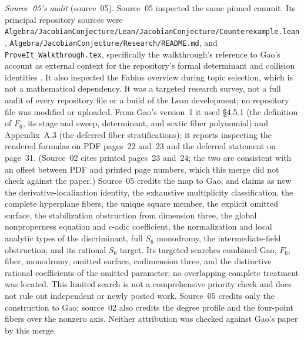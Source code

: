 \documentclass[11pt,a4paper]{article}
\theoremstyle{definition}
\newcommand{\code}[1]{\texttt{\nolinkurl{#1}}}
\newcommand{\src}[1]{\textup{(source~#1)}}
\begin{document}
\emph{Source~05's audit} \src{05}. Source~05 inspected the same pinned commit.
Its principal repository sources were
\code{Algebra/JacobianConjecture/Lean/JacobianConjecture/Counterexample.lean},
\code{Algebra/JacobianConjecture/Research/README.md}, and
\code{ProveIt_Walkthrough.tex}, specifically the walkthrough's reference to
Gao's account as external context for the repository's formal determinant
and collision identities \cite{ProveItWalkthrough}. It also inspected the
Fabius overview during topic selection, which is not a mathematical
dependency. It was a targeted research survey, not a full audit of every
repository file or a build of the Lean development; no repository file was
modified or uploaded. From Gao's version~1 it used \S4.5.1 (the definition of
$F_6$, its stage and sweep, determinant, and sextic fiber polynomial) and
Appendix~A.3 (the deferred fiber stratifications); it reports inspecting the
rendered formulas on PDF pages~22 and~23 and the deferred statement on
page~31. (Source~02 cites printed pages~23 and~24; the two are consistent
with an offset between PDF and printed page numbers, which this merge did
not check against the paper.) Source~05 credits the map to Gao, and claims
as new the derivative-localization identity, the exhaustive multiplicity
classification, the complete hyperplane fibers, the unique square member, the
explicit omitted surface, the stabilization obstruction from dimension three,
the global nonproperness equation and $c$-adic coefficient, the normalization
and local analytic types of the discriminant, full $S_6$ monodromy, the
intermediate-field obstruction, and its rational $S_6$ target. Its targeted
searches combined Gao, $F_6$, fiber, monodromy, omitted surface, codimension
three, and the distinctive rational coefficients of the omitted parameter; no
overlapping complete treatment was located. This limited search is not a
comprehensive priority check and does not rule out independent or newly
posted work. Source~05 credits only the construction to Gao; source~02 also
credits the degree profile and the four-point fibers over the nonzero axis.
Neither attribution was checked against Gao's paper by this merge.

\end{document}
